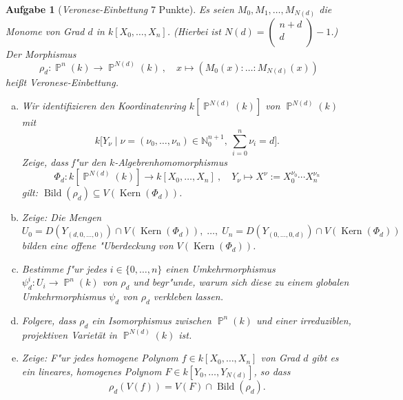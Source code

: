\documentclass[a4paper, 12pt, numbers=noendperiod, chapterprefix=true]{scrbook}
\theoremstyle{break}
\newtheorem{Aufg}{Aufgabe}
\theoremstyle{nonumberbreak}
\theoremstyle{nonumberplain}
\newcommand{\quot}[1]{\textrm{\glqq}{#1}\textrm{\grqq}}
\newcommand{\textvector}[2]{\left(\begin{smallmatrix} #1\\ #2\\ \end{smallmatrix}\right)}
\DeclareMathOperator{\Bild}{Bild}
\DeclareMathOperator{\Kern}{Kern}
\newcommand{\N}{\mathbb{N}}
\newcommand{\A}{\mathbb{A}}
\DeclareMathOperator{\Projective}{\mathbb{P}} %
\begin{document}
\begin{Aufg}[\textit{Veronese-Einbettung} 7 Punkte]
Es seien $M_0,M_1,\dots, M_{N(d)}$ die Monome von Grad $d$ in $k[X_0,\dots,X_n]$. (Hierbei ist $N(d) = \textvector{n+d}{d}-1$.) Der Morphismus
	\[\rho_d :\Projective^n(k)\to \Projective^{N(d)}(k)\ ,\quad x\mapsto (M_0(x):\ldots :M_{N(d)}(x))\]
hei\ss t \emph{Veronese-Einbettung}.
\begin{enumerate}[a)]
	\item Wir identifizieren den Koordinatenring $k[\Projective^{N(d)}(k)]$ von $\Projective^{N(d)}(k)$ mit
		\[ k\bigl[Y_{\nu}\mid \nu = (\nu_0,\dots,\nu_n) \in \N_0^{n+1},\ \sum_{i=0}^{n} \nu_i = d\bigr].\]
	Zeige, dass f"ur den $k$-Algebrenhomomorphismus
		\[\Phi_d : k[\Projective^{N(d)}(k)] \to k[X_0,\dots,X_n]\ ,\quad Y_\nu \mapsto X^\nu := X_0^{\nu_0}\cdots X_n^{\nu_n}\]
	gilt: $\Bild(\rho_d)\subseteq V(\Kern(\Phi_d))$.
	\item Zeige: Die Mengen 
		\[U_0 = D(Y_{(d,0,\dots,0)})\cap V(\Kern(\Phi_d)),\; \dots,\; U_n = D(Y_{(0,\dots,0,d)})\cap V(\Kern(\Phi_d))\]
	bilden eine offene "Uberdeckung von $V(\Kern(\Phi_d))$.
	\item Bestimme f"ur jedes $i\in \{0,\dots, n\}$ einen Umkehrmorphismus $\psi_d^i:U_i \to \Projective^n(k)$ von $\rho_d$ und begr"unde, warum sich diese zu einem globalen Umkehrmorphismus $\psi_d$ von $\rho_d$ \quot{verkleben} lassen.
	\item Folgere, dass $\rho_d$ ein Isomorphismus zwischen $\Projective^n(k)$ und einer irreduziblen, projektiven Variet\"at in $\Projective^{N(d)}(k)$ ist.
	\item Zeige: F"ur jedes homogene Polynom $f\in k[X_0,\dots,X_n]$ von Grad $d$ gibt es ein lineares, homogenes Polynom $F\in k[Y_0,\dots,Y_{N(d)}]$, so dass
		\[\rho_d(V(f)) = V(F)\cap \Bild(\rho_d).\]
\end{enumerate}\end{Aufg}
\end{document}
